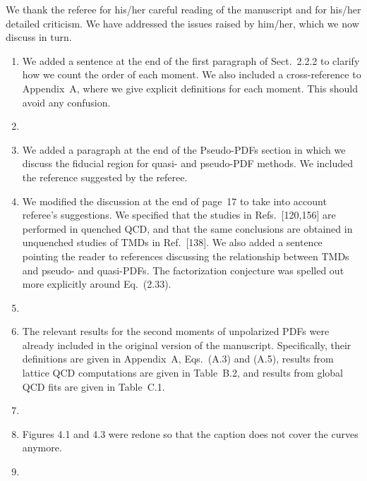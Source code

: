 \documentclass[11pt]{article}
\begin{document}

We thank the referee for his/her careful reading of the manuscript and for 
his/her detailed criticism. We have addressed the issues raised by 
him/her, which we now discuss in turn.

\begin{enumerate}

\item We added a sentence at the end of the first paragraph of Sect.~2.2.2
to clarify how we count the order of each moment. We also included a 
cross-reference to Appendix~A, where we give explicit definitions for each
moment. This should avoid any confusion.

\item 

\item We added a paragraph at the end of the Pseudo-PDFs section in which
we discuss the fiducial region for quasi- and pseudo-PDF methods.
We included the reference suggested by the referee. 

\item We modified the discussion at the end of page~17 to take into 
account referee's suggestions. We specified that
the studies in Refs.~[120,156] are performed in quenched QCD, and that the
same conclusions are obtained in unquenched studies of TMDs in Ref.~[138].
We also added a sentence pointing the reader to references discussing the
relationship between TMDs and pseudo- and quasi-PDFs.
The factorization conjecture was spelled out more explicitly around Eq.~(2.33).

\item

\item The relevant results for the second moments of unpolarized PDFs
were already included in the original version of the manuscript. 
Specifically, their definitions are given in Appendix~A, Eqs.~(A.3) and (A.5),
results from lattice QCD computations are given in Table~B.2, and results from
global QCD fits are given in Table~C.1.

\item

\item Figures 4.1 and 4.3 were redone so that the
caption does not cover the curves anymore.

\item 

\end{enumerate}
\end{document}
